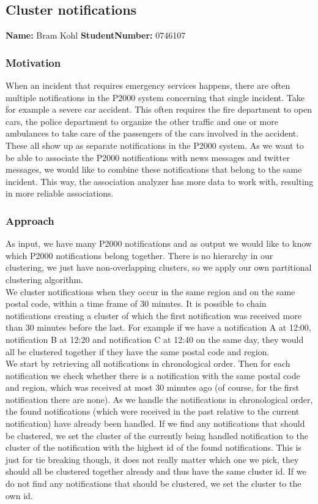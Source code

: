 \subsection{Cluster notifications}
\textbf{Name:} Bram Kohl \indent \textbf{StudentNumber:} 0746107

\subsubsection*{Motivation}
When an incident that requires emergency services happens, there are often multiple notifications in the P2000 system concerning that single incident. Take for example a severe car accident. This often requires the fire department to open cars, the police department to organize the other traffic and one or more ambulances to take care of the passengers of the cars involved in the accident. These all show up as separate notifications in the P2000 system. As we want to be able to associate the P2000 notifications with news messages and twitter messages, we would like to combine these notifications that belong to the same incident. This way, the association analyzer has more data to work with, resulting in more reliable associations.
\subsubsection*{Approach}
As input, we have many P2000 notifications and as output we would like to know which P2000 notifications belong together. There is no hierarchy in our clustering, we just have non-overlapping clusters, so we apply our own partitional clustering algorithm.\\

We cluster notifications when they occur in the same region and on the same postal code, within a time frame of 30 minutes. It is possible to chain notifications creating a cluster of which the first notification was received more than 30 minutes before the last. For example if we have a notification A at 12:00, notification B at 12:20 and notification C at 12:40 on the same day, they would all be clustered together if they have the same postal code and region.\\

We start by retrieving all notifications in chronological order. Then for each notification we check whether there is a notification with the same postal code and region, which was received at most 30 minutes ago (of course, for the first notification there are none). As we handle the notifications in chronological order, the found notifications (which were received in the past relative to the current notification) have already been handled. If we find any notifications that should be clustered, we set the cluster of the currently being handled notification to the cluster of the notification with the highest id of the found notifications. This is just for tie breaking though, it does not really matter which one we pick, they should all be clustered together already and thus have the same cluster id. If we do not find any notifications that should be clustered, we set the cluster to the own id.\\


